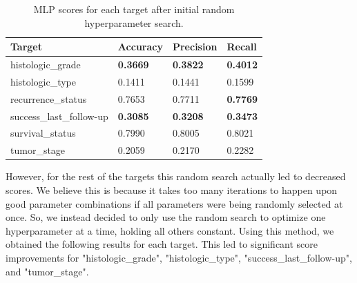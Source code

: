 \documentclass{article}
\begin{document}
\medskip

\begin{table}[H]
\begin{center}
\begin{tabular}{ *{4}{l} }
    \multicolumn{1}{p{1.5cm}}{\raggedright Target} &  
    \multicolumn{1}{p{1.5cm}}{\raggedright Accuracy} &  
    \multicolumn{1}{p{1.5cm}}{\raggedright Precision} &  
    \multicolumn{1}{p{1.5cm}}{\raggedright Recall} \\ \hline
histologic\_grade       &              \textbf{0.3669} &               \textbf{0.3822} &            \textbf{0.4012} \\
histologic\_type        &              0.1411 &               0.1441 &            0.1599 \\
recurrence\_status      &              0.7653 &               0.7711 &            \textbf{0.7769} \\
success\_last\_follow-up &              \textbf{0.3085} &               \textbf{0.3208} &            \textbf{0.3473} \\
survival\_status        &              0.7990 &               0.8005 &            0.8021 \\
tumor\_stage            &              0.2059 &               0.2170 &            0.2282 \\
\end{tabular}
\caption{MLP scores for each target after initial random hyperparameter search.}
\end{center}
\end{table}

However, for the rest of the targets this random search actually led to decreased scores. We believe this is because it takes too many iterations to happen upon good parameter combinations if all parameters were being randomly selected at once. So, we instead decided to only use the random search to optimize one hyperparameter at a time, holding all others constant. Using this method, we obtained the following results for each target. This led to significant score improvements for "histologic\_grade", "histologic\_type", "success\_last\_follow-up", and "tumor\_stage".
\end{document}
